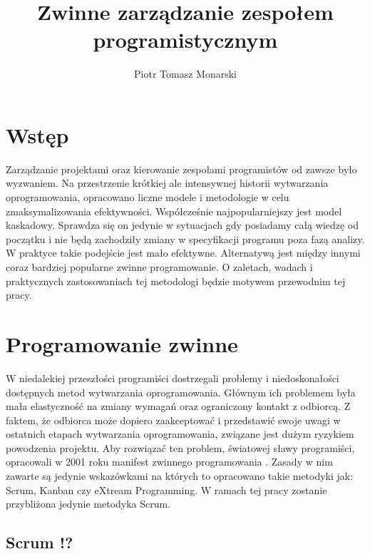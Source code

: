 


\title{Zwinne zarządzanie zespołem programistycznym}
\author{Piotr Tomasz Monarski}



\maketitle

\section{Wstęp}

Zarządzanie projektami oraz kierowanie zespołami programistów od zawsze było wyzwaniem. Na przestrzenie krótkiej ale intensywnej historii wytwarzania oprogramowania, opracowano liczne modele i metodologie w celu zmaksymalizowania efektywności. Współcześnie najpopularniejszy jest model kaskadowy. Sprawdza się on jedynie w sytuacjach gdy posiadamy całą wiedzę od początku i nie będą zachodziły zmiany w specyfikacji programu poza fazą analizy. W praktyce takie podejście jest mało efektywne. Alternatywą jest między innymi coraz bardziej popularne zwinne programowanie. O zaletach, wadach i praktycznych zastosowaniach tej metodologi będzie motywem przewodnim tej pracy. 

\section{Programowanie zwinne}

W niedalekiej przeszłości programiści dostrzegali problemy i niedoskonałości dostępnych metod wytwarzania oprogramowania. Głównym ich problemem była mała elastyczność na zmiany wymagań oraz ograniczony kontakt z odbiorcą. Z faktem, że odbiorca może dopiero zaakceptować i przedstawić swoje uwagi w ostatnich etapach wytwarzania oprogramowania, związane jest dużym ryzykiem powodzenia projektu. Aby rozwiązać ten problem, światowej sławy programiści, opracowali w 2001 roku manifest zwinnego programowania \cite{agile_manifesto}. Zasady w nim zawarte są jedynie wskazówkami na których to opracowano takie metodyki jak: Scrum, Kanban czy eXtream Programming. W ramach tej pracy zostanie przybliżona jedynie metodyka Scrum.

\subsection{Scrum !?}

